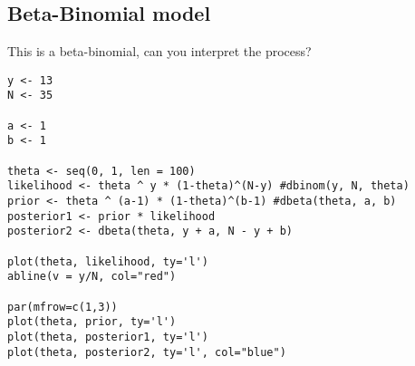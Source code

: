 \documentclass[11pt,a4paper]{article}
\begin{document}
\begin{CJK*}{UTF8}{gbsn}
\subsection{Beta-Binomial model}
This is a beta-binomial, can you interpret the process?
\begin{lstlisting}
y <- 13
N <- 35

a <- 1
b <- 1

theta <- seq(0, 1, len = 100)
likelihood <- theta ^ y * (1-theta)^(N-y) #dbinom(y, N, theta)
prior <- theta ^ (a-1) * (1-theta)^(b-1) #dbeta(theta, a, b)
posterior1 <- prior * likelihood
posterior2 <- dbeta(theta, y + a, N - y + b)

plot(theta, likelihood, ty='l')
abline(v = y/N, col="red")

par(mfrow=c(1,3))
plot(theta, prior, ty='l')
plot(theta, posterior1, ty='l')
plot(theta, posterior2, ty='l', col="blue")

\end{lstlisting}


\end{CJK*}
\end{document}
